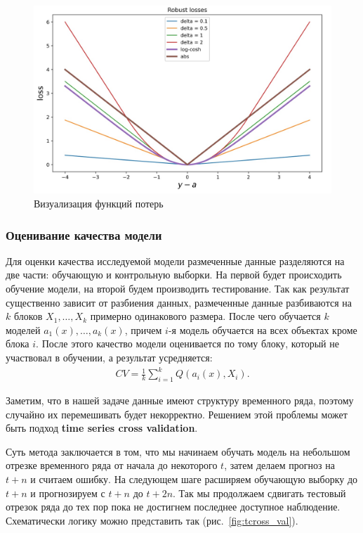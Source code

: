 \documentclass[12pt,a4paper]{article} %
\begin{document}
\begin{figure}[h]
	
	\centering
	
	\includegraphics[width=0.7\linewidth]{loss_func.jpg}
	
	\caption{Визуализация функций потерь}
	
	\label{fig:loss_func}
	
\end{figure}

\subsubsection{Оценивание качества модели}

Для оценки качества исследуемой модели размеченные данные разделяются на две части: обучающую и контрольную выборки. На первой будет происходить обучение модели, на второй будем производить тестирование. Так как результат существенно зависит от разбиения данных, размеченные данные разбиваются на $k$ блоков $X_1, \dots, X_k$ примерно одинакового размера. После чего обучается $k$ моделей $a_1(x), \dots, a_k(x)$, причем $i$-я модель обучается на всех объектах кроме блока $i$. После этого качество модели оценивается по тому блоку, который не участвовал в обучении, а результат усредняется:
 \begin{gather}\label{modelquality}
	CV = \frac{1}{k}\sum\limits_{i=1}^{k}Q(a_i(x), X_i).
\end{gather}

Заметим, что в нашей задаче данные имеют структуру временного ряда, поэтому случайно их перемешивать будет некорректно. Решением этой проблемы может быть подход \textbf{time series cross validation}.

Суть метода заключается в том, что мы начинаем обучать модель на небольшом отрезке временного ряда от начала до некоторого $t$, затем делаем прогноз на $t+n$ и считаем ошибку. На следующем шаге расширяем обучающую выборку до $t+n$ и прогнозируем с $t+n$ до $t+2n$. Так мы продолжаем сдвигать тестовый отрезок ряда до тех пор пока не достигнем последнее доступное наблюдение. Схематически логику можно представить так (рис.~\ref{fig:tcross_val}). 
\end{document}
